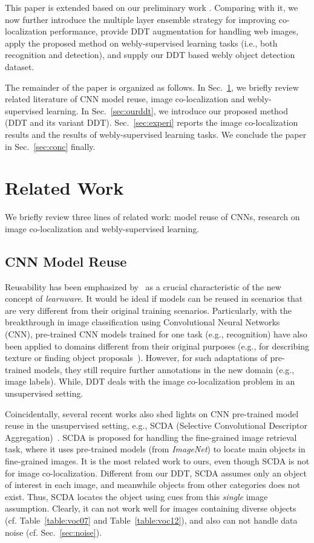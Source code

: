 \documentclass[twocolumn]{svjour3}          \smartqed  \usepackage{graphicx}
\begin{document}
This paper is extended based on our preliminary work \citep{ddtijcai}. Comparing with it, we now further introduce the multiple layer ensemble strategy for improving co-localization performance, provide DDT augmentation for handling web images, apply the proposed method on webly-supervised learning tasks (i.e., both recognition and detection), and supply our DDT based webly object detection dataset.

The remainder of the paper is organized as follows. In Sec.~\ref{sec:related}, we briefly review related literature of CNN model reuse, image co-localization and webly-supervised learning. In Sec.~\ref{sec:ourddt}, we introduce our proposed method (DDT and its variant DDT). Sec.~\ref{sec:experi} reports the image co-localization results and the results of webly-supervised learning tasks. We conclude the paper in Sec.~\ref{sec:conc} finally.

\section{Related Work}\label{sec:related}

We briefly review three lines of related work: model reuse of CNNs, research on image co-localization and webly-supervised learning.

\subsection{CNN Model Reuse}

Reusability has been emphasized by~\citep{learnware} as a crucial characteristic of the new concept of \emph{learnware}. It would be ideal if models can be reused in scenarios that are very different from their original training scenarios. Particularly, with the breakthrough in image classification using Convolutional Neural Networks (CNN), pre-trained CNN models trained for one task (e.g., recognition) have also been applied to domains different from their original purposes (e.g., for describing texture \citep{majiijcv2016} or finding object proposals~\citep{Amir15ICCV}). However, for such adaptations of pre-trained models, they still require further annotations in the new domain (e.g., image labels). While, DDT deals with the image co-localization problem in an unsupervised setting.

Coincidentally, several recent works also shed lights on CNN pre-trained model reuse in the unsupervised setting, e.g., SCDA (Selective Convolutional Descriptor Aggregation)~\citep{scda2016}. SCDA is proposed for handling the fine-grained image retrieval task, where it uses pre-trained models (from \emph{ImageNet}) to locate main objects in fine-grained images. It is the most related work to ours, even though SCDA is not for image co-localization. Different from our DDT, SCDA assumes only an object of interest in each image, and meanwhile objects from other categories does not exist. Thus, SCDA locates the object using cues from this \emph{single} image assumption. Clearly, it can not work well for images containing diverse objects (cf. Table~\ref{table:voc07} and Table~\ref{table:voc12}), and also can not handle data noise (cf. Sec.~\ref{sec:noise}).
\end{document}
